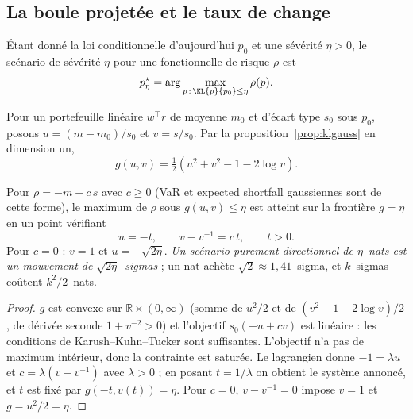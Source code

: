 \subsection{La boule projetée et le taux de change}

\begin{definition}
Étant donné la loi conditionnelle d'aujourd'hui $p_0$ et une sévérité $\eta>0$,
le scénario de sévérité $\eta$ pour une fonctionnelle de risque $\rho$ est
\begin{equation}
\label{eq:ball}
p^\star_\eta=\arg\max_{p\,:\,\KL{p}{p_0}\le\eta}\rho(p).
\end{equation}
\end{definition}

Pour un portefeuille linéaire $w^\top r$ de moyenne $m_0$ et d'écart type $s_0$
sous $p_0$, posons $u=(m-m_0)/s_0$ et $v=s/s_0$. Par la
proposition~\ref{prop:klgauss} en dimension un,
\begin{equation}
\label{eq:g}
g(u,v)=\tfrac12\left(u^2+v^2-1-2\log v\right).
\end{equation}

\begin{proposition}
\label{prop:ballsol}
Pour $\rho=-m+c\,s$ avec $c\ge0$ (VaR et expected shortfall gaussiennes sont de
cette forme), le maximum de $\rho$ sous $g(u,v)\le\eta$ est atteint sur la
frontière $g=\eta$ en un point vérifiant
\begin{equation*}
u=-t,\qquad v-v^{-1}=c\,t,\qquad t>0 .
\end{equation*}
Pour $c=0$ : $v=1$ et $u=-\sqrt{2\eta}$. \emph{Un scénario purement
directionnel de $\eta$~nats est un mouvement de $\sqrt{2\eta}$~sigmas} ; un
nat achète $\sqrt2\approx1{,}41$~sigma, et $k$~sigmas coûtent $k^2/2$~nats.
\end{proposition}

\begin{proof}
$g$ est convexe sur $\mathbb R\times(0,\infty)$ (somme de $u^2/2$ et de
$(v^2-1-2\log v)/2$, de dérivée seconde $1+v^{-2}>0$) et l'objectif
$s_0(-u+cv)$ est linéaire : les conditions de Karush--Kuhn--Tucker sont
suffisantes. L'objectif n'a pas de maximum intérieur, donc la contrainte est
saturée. Le lagrangien donne $-1=\lambda u$ et $c=\lambda(v-v^{-1})$ avec
$\lambda>0$ ; en posant $t=1/\lambda$ on obtient le système annoncé, et $t$ est
fixé par $g(-t,v(t))=\eta$. Pour $c=0$, $v-v^{-1}=0$ impose $v=1$ et
$g=u^2/2=\eta$.
\end{proof}


